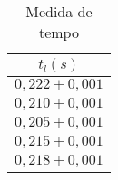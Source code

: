 \begin{table}[h]
    \centering
    \begin{tabular}{|c|}
        \hline
        $t_l (s)$ \\
        \hline
        $0,222 \pm 0,001$ \\
        \hline
        $0,210 \pm 0,001$ \\
        \hline
        $0,205 \pm 0,001$ \\
        \hline
        $0,215 \pm 0,001$ \\
        \hline
        $0,218 \pm 0,001$ \\
        \hline
    \end{tabular}
    \caption{Medida de tempo}
    \label{tab:tempos}
\end{table}

